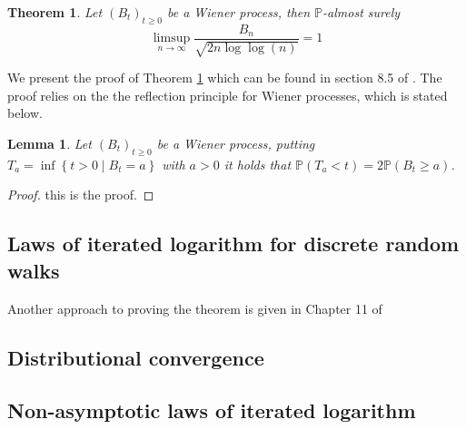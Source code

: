 \documentclass{article}
\newtheorem{theorem}{Theorem}[section]
\newtheorem{lemma}{Lemma}[section]
\begin{document}
\begin{theorem}
Let $\left (B_t \right )_{t \geq 0}$ be a Wiener process, then $\mathbb{P}$-almost surely
\begin{equation}
\limsup\limits_{n \rightarrow \infty} \frac{B_n}{\sqrt{2 n \log \log (n)}} = 1 
\end{equation}
\label{theorem: BM LIL}
\end{theorem}
We present the proof of Theorem \ref{theorem: BM LIL} which can be found in section 8.5 of \cite{durrett2019probability}. The proof relies on the the reflection principle for Wiener processes, which is stated below. 
\begin{lemma}
Let $\left (B_t \right )_{t \geq 0}$ be a Wiener process, putting $T_a = \inf \left \{ t > 0 \mid B_t = a \right \}$ with $a > 0$ it holds that $\mathbb{P} \left ( T_a < t \right ) = 2 \mathbb{P} \left ( B_t \geq a \right )$. 
\end{lemma}
\begin{proof}
this is the proof. 
\end{proof}

\subsection{Laws of iterated logarithm for discrete random walks} \label{section: laws of iterated logarithm for discrete random walks}

Another approach to proving the theorem is given in Chapter 11 of \cite{pollard2002user}

\subsection{Distributional convergence}

\subsection{Non-asymptotic laws of iterated logarithm}

\newpage



\end{document}
